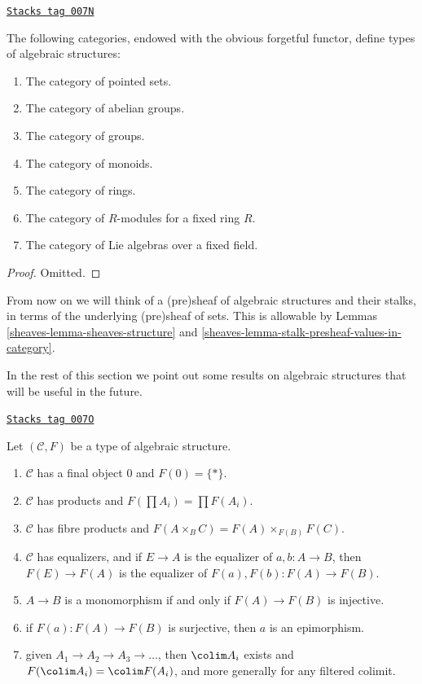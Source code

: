 \begin{lemma}
\label{sheaves-lemma-list-algebraic-structures}
\href{https://stacks.math.columbia.edu/tag/007N}{\texttt{Stacks tag 007N}}

The following categories, endowed with the obvious forgetful
functor, define types of algebraic structures:
\begin{enumerate}
\item The category of pointed sets.
\item The category of abelian groups.
\item The category of groups.
\item The category of monoids.
\item The category of rings.
\item The category of $R$-modules for a fixed ring $R$.
\item The category of Lie algebras over a fixed field.
\end{enumerate}
\end{lemma}

\begin{proof}
Omitted.
\end{proof}

From now on we will think of a (pre)sheaf of algebraic structures
and their stalks, in terms of the underlying (pre)sheaf of sets.
This is allowable by Lemmas \ref{sheaves-lemma-sheaves-structure} and
\ref{sheaves-lemma-stalk-presheaf-values-in-category}.

\medskip\noindent
In the rest of this section we point out some results
on algebraic structures that will be useful in the future.

\begin{lemma}
\label{sheaves-lemma-properties-algebraic-structures}
\href{https://stacks.math.columbia.edu/tag/007O}{\texttt{Stacks tag 007O}}

Let $(\mathcal{C}, F)$ be a type of algebraic structure.
\begin{enumerate}
\item $\mathcal{C}$ has a final object $0$ and $F(0) = \{ * \}$.
\item $\mathcal{C}$ has products and $F(\prod A_i) = \prod F(A_i)$.
\item $\mathcal{C}$ has fibre products and
$F(A \times_B C) = F(A)\times_{F(B)}F(C)$.
\item $\mathcal{C}$ has equalizers, and if $E \to A$
is the equalizer of $a, b : A \to B$, then
$F(E) \to F(A)$ is the equalizer of $F(a), F(b) : F(A) \to F(B)$.
\item $A \to B$ is a monomorphism if and only if
$F(A) \to F(B)$ is injective.
\item if $F(a) : F(A) \to F(B)$ is surjective, then
$a$ is an epimorphism.
\item given $A_1 \to A_2 \to A_3 \to \ldots$, then
$\colim A_i$ exists and $F(\colim A_i) = \colim F(A_i)$,
and more generally for any filtered colimit.
\end{enumerate}
\end{lemma}

